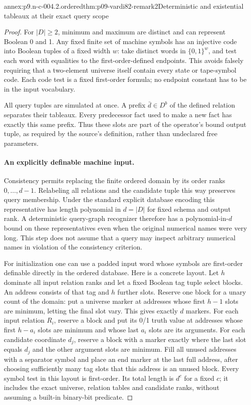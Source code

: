 \begin{annexitem}{annex:p9.n-c-004.2.ordered}{thm:p09-vardi82-remark2}{Deterministic and existential tableaux at their exact query scope}
\begin{proof}
For \(\lvert D\rvert\geq2\), minimum and maximum are distinct and
can represent Boolean 0 and 1.  Any fixed finite set of machine symbols has
an injective code into Boolean tuples of a fixed width \(w\): take distinct
words in \(\{0,1\}^w\), and test each word with equalities to the
first-order-defined endpoints.  This avoids falsely requiring that a
two-element universe itself contain every state or tape-symbol code.
Each code test is a fixed first-order formula; no endpoint constant has to be
in the input vocabulary.

All query tuples are simulated at once.  A prefix \(\bar d\in D^b\)
of the defined relation separates their tableaux.  Every predecessor fact
used to make a new fact has exactly this same prefix.  Thus these slots are
part of the operator's bound output tuple, as required by the source's
definition, rather than undeclared free parameters.

\paragraph{An explicitly definable machine input.}
Consistency permits replacing the finite ordered domain by its order ranks
\(0,\ldots,d-1\).  Relabeling all relations and the candidate tuple this
way preserves query membership.  Under the standard explicit database
encoding this representative has length polynomial in \(d=\lvert D\rvert\)
for fixed schema and output rank.  A deterministic query-graph recognizer
therefore has a polynomial-in-\(d\) bound on these representatives even
when the original numerical names were very long.  This step does not
assume that a query may inspect arbitrary numerical names in violation of
the consistency criterion.

For initialization one can use a padded input word whose symbols are
first-order definable directly in the ordered database.  Here is a concrete
layout.  Let \(h\) dominate all input relation ranks and let a fixed
Boolean tag tuple select blocks.  An address consists of that tag and
\(h\) further slots.  Reserve one block for a unary count of the domain:
put a universe marker at addresses whose first \(h-1\) slots are minimum,
letting the final slot vary.  This gives exactly \(d\) markers.
For each input relation \(R_i\), reserve a block and put its 0/1 truth value
at addresses whose first \(h-a_i\) slots are minimum and whose last
\(a_i\) slots are its arguments.  For each candidate coordinate \(d_j\),
reserve a block with a marker exactly where the last slot equals \(d_j\)
and the other argument slots are minimum.  Fill all unused addresses with
a separator symbol and place an end marker at the last full address, after
choosing sufficiently many tag slots that this address is an unused block.
Every symbol test in this layout is first-order.  Its total length is
\(d^c\) for a fixed \(c\); it includes the exact universe, relation tables
and candidate ranks, without assuming a built-in binary-bit predicate.


\end{proof}
\end{annexitem}

